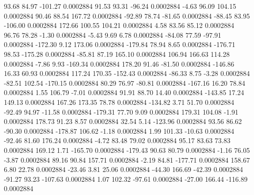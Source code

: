        93.68       84.97     -101.27     0.0002884
       91.53       93.31      -96.24     0.0002884
       -4.63       96.09      104.15     0.0002884
       90.46       88.54      167.72     0.0002884
      -92.89       78.74      -81.65     0.0002884
      -88.45       83.95     -106.00     0.0002884
      172.66      100.55      104.21     0.0002884
        4.58       83.56       85.12     0.0002884
       96.76       78.28       -1.30     0.0002884
       -5.43        9.69        6.78     0.0002884
      -84.08       77.59      -97.91     0.0002884
     -172.30        9.12      173.06     0.0002884
     -179.84       78.94        8.65     0.0002884
     -176.71       98.53     -175.28     0.0002884
      -85.81       87.19      165.10     0.0002884
      106.94      166.63      114.28     0.0002884
       -7.86        9.93     -169.34     0.0002884
      178.20       91.46      -81.50     0.0002884
     -146.86       16.33       60.93     0.0002884
      117.24      170.35     -152.43     0.0002884
      -86.33        8.75       -3.28     0.0002884
      -82.51      102.54     -170.15     0.0002884
       80.29       76.97      -80.81     0.0002884
     -167.16       16.20       78.84     0.0002884
        1.55      106.79       -7.01     0.0002884
       91.91       88.70       14.40     0.0002884
     -143.85       17.24      149.13     0.0002884
      167.26      173.35       78.78     0.0002884
     -134.82        3.71       51.70     0.0002884
      -92.49       94.97      -11.58     0.0002884
     -179.31       77.70        9.09     0.0002884
      179.31      104.08       -1.91     0.0002884
      178.73       91.23        8.57     0.0002884
       32.54        5.14     -123.96     0.0002884
       93.56       86.62      -90.30     0.0002884
     -178.87      106.62       -1.18     0.0002884
        1.99      101.33      -10.63     0.0002884
      -92.46       81.60      176.24     0.0002884
       -4.72       83.48       79.02     0.0002884
       95.17       83.63       73.83     0.0002884
      169.12        1.71     -165.70     0.0002884
     -179.43       90.63       80.79     0.0002884
       -1.16       76.05       -3.87     0.0002884
       89.16       90.84      157.71     0.0002884
       -2.19       84.81     -177.71     0.0002884
      158.67        6.80       22.78     0.0002884
      -23.46        3.81       25.06     0.0002884
      -44.30      166.69      -42.39     0.0002884
      -91.27       93.23     -107.63     0.0002884
        1.07      102.32      -97.61     0.0002884
      -27.00      166.44     -116.89     0.0002884
